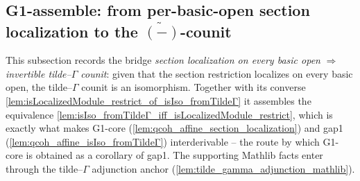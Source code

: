 \subsection{G1-assemble: from per-basic-open section localization to the
\texorpdfstring{$\widetilde{(-)}$}{tilde}-counit}

This subsection records the bridge \emph{section localization on every basic open}
\(\Rightarrow\) \emph{invertible tilde--\(\Gamma\) counit}: given that the section
restriction localizes on every basic open, the tilde--\(\Gamma\) counit is an
isomorphism. Together with its converse
\cref{lem:isLocalizedModule_restrict_of_isIso_fromTildeΓ} it assembles the equivalence
\cref{lem:isIso_fromTildeΓ_iff_isLocalizedModule_restrict}, which is exactly what makes G1-core
(\cref{lem:qcoh_affine_section_localization}) and gap1
(\cref{lem:qcoh_affine_isIso_fromTildeΓ}) interderivable -- the route by which G1-core is obtained as
a corollary of gap1. The supporting Mathlib facts enter through the tilde--\(\Gamma\)
adjunction anchor (\cref{lem:tilde_gamma_adjunction_mathlib}).


